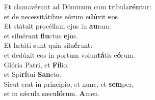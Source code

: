 \evenverse Et clamavérunt ad Dóminum cum tribula\textbf{rén}tur:~\*\\
\evenverse et de necessitátibus eórum e\textbf{dú}xit \textbf{e}os.\\
\oddverse Et státuit procéllam ejus in \textbf{au}ram:~\*\\
\oddverse et siluérunt \textbf{flu}ctus \textbf{e}jus.\\
\evenverse Et lætáti sunt quia silu\textbf{é}runt:~\*\\
\evenverse et dedúxit eos in portum volun\textbf{tá}tis e\textbf{ó}rum.\\
\oddverse Glória Patri, et \textbf{Fí}lio,~\*\\
\oddverse et Spi\textbf{rí}tui \textbf{San}cto.\\
\evenverse Sicut erat in princípio, et nunc, et \textbf{sem}per,~\*\\
\evenverse et in sǽcula sæcu\textbf{ló}rum. \textbf{A}men.\\

